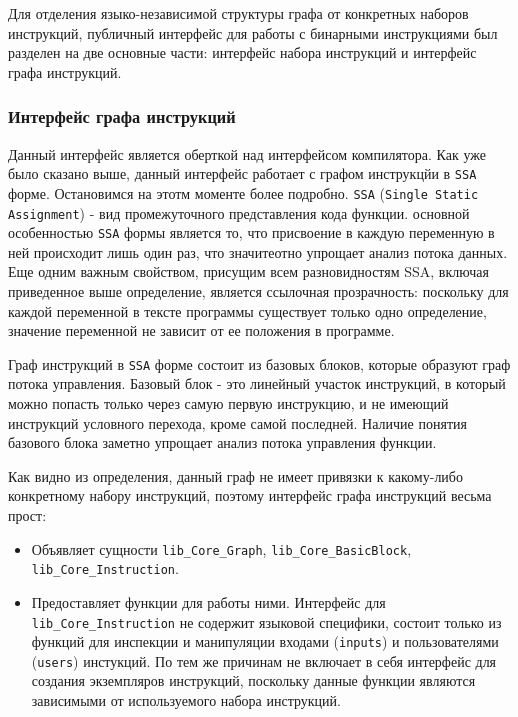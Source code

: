 Для отделения языко-независимой структуры графа от конкретных наборов инструкций, публичный интерфейс для работы с бинарными инструкциями был разделен на две основные части: интерфейс набора инструкций и интерфейс графа инструкций.

\subsubsection{Интерфейс графа инструкций}

Данный интерфейс является оберткой над интерфейсом компилятора. Как уже было сказано выше, данный интерфейс работает с графом инструкцйи в \texttt{SSA} форме. Остановимся на этотм моменте более подробно. \texttt{SSA} (\texttt{Single Static Assignment}) - вид промежуточного представления кода функции. основной особенностью \texttt{SSA} формы является то, что присвоение в каждую переменную в ней происходит лишь один раз, что значитеотно упрощает анализ потока данных. Еще одним важным свойством, присущим всем разновидностям SSA, включая приведенное выше определение, является ссылочная прозрачность: поскольку для каждой переменной в тексте программы существует только одно определение, значение переменной не зависит от ее положения в программе.

Граф инструкций в \texttt{SSA} форме состоит из базовых блоков, которые образуют граф потока управления. Базовый блок - это линейный участок инструкций, в который можно попасть только через самую первую инструкцию, и не имеющий инструкций условного перехода, кроме самой последней. Наличие понятия базового блока заметно упрощает анализ потока управления функции.

Как видно из определения, данный граф не имеет привязки к какому-либо конкретному набору инструкций, поэтому интерфейс графа инструкций весьма прост:

\begin{itemize}
    \item Объявляет сущности \texttt{lib\_Core\_Graph}, \texttt{lib\_Core\_BasicBlock}, \texttt{lib\_Core\_Instruction}.
    \item Предоставляет функции для работы ними. Интерфейс для \texttt{lib\_Core\_Instruction} не содержит языковой специфики, состоит только из функций для инспекции и манипуляции входами (\texttt{inputs}) и пользователями (\texttt{users}) инстукций. По тем же причинам не включает в себя интерфейс для создания экземпляров инструкций, поскольку данные функции являются зависимыми от используемого набора инструкций.
\end{itemize}

